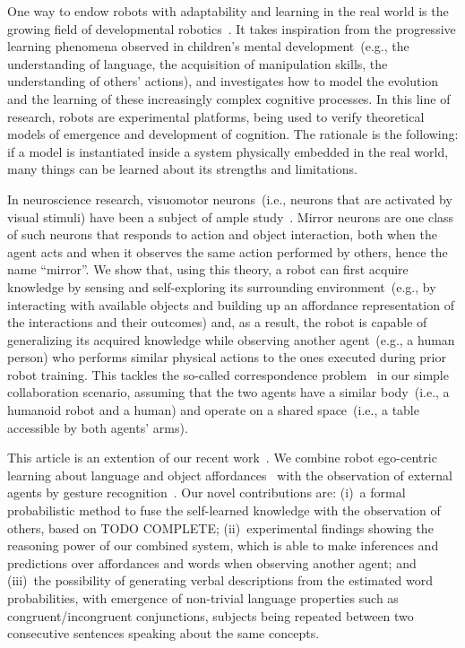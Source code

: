 One way to endow robots with adaptability and learning in the real world is the growing field of developmental robotics~\cite{lungarella:2003:devrobsurvey,cangelosi:2015:devrobbook}.
It takes inspiration from the progressive learning phenomena observed in children's mental development~(e.g., the understanding of language, the acquisition of manipulation skills, the understanding of others' actions), and investigates how to model the evolution and the learning of these increasingly complex cognitive processes.
In this line of research, robots are experimental platforms, being used to verify theoretical models of emergence and development of cognition.
The rationale is the following: if a model is instantiated inside a system physically embedded in the real world, many things can be learned about its strengths and limitations.

In neuroscience research, visuomotor neurons~(i.e., neurons that are activated by visual stimuli) have been a subject of ample study~\cite{rizzolatti:2001:nrn}.
Mirror neurons are one class of such neurons that responds to action and object interaction, both when the agent acts and when it observes the same action performed by others, hence the name ``mirror''.
We show that, using this theory, a robot can first acquire knowledge by sensing and self-exploring its surrounding environment~(e.g., by interacting with available objects and building up an affordance representation of the interactions and their outcomes) and, as a result, the robot is capable of generalizing its acquired knowledge while observing another agent~(e.g., a human person) who performs similar physical actions to the ones executed during prior robot training.
This tackles the so-called correspondence problem~\cite{nehaniv:2002:correspondence} in our simple collaboration scenario, assuming that the two agents have a similar body~(i.e., a humanoid robot and a human) and operate on a shared space~(i.e., a table accessible by both agents' arms).

This article is an extention of our recent work~\cite{saponaro:2017:glu}.
We combine robot ego-centric learning about language and object affordances~\cite{salvi:2012:smcb} with the observation of external agents by gesture recognition~\cite{saponaro:2013:crhri}.
Our novel contributions are:
(i)~a formal probabilistic method to fuse the self-learned knowledge with the observation of others, based on TODO COMPLETE;
(ii)~experimental findings showing the reasoning power of our combined system, which is able to make inferences and predictions over affordances and words when observing another agent; and
(iii)~the possibility of generating verbal descriptions from the estimated word probabilities, with emergence of non-trivial language properties such as congruent/incongruent conjunctions, subjects being repeated between two consecutive sentences speaking about the same concepts.

